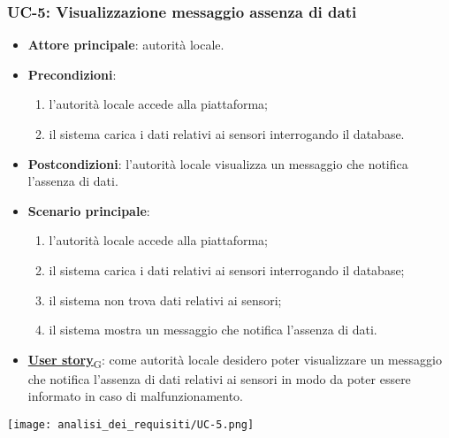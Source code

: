 
\newpage
\subsubsection{UC-5: Visualizzazione messaggio assenza di dati}
\begin{itemize}
	\item \textbf{Attore principale}: autorità locale.
	\item \textbf{Precondizioni}:
	      \begin{enumerate}
		      \item l'autorità locale accede alla piattaforma;
		      \item il sistema carica i dati relativi ai sensori interrogando il database.
	      \end{enumerate}
	\item \textbf{Postcondizioni}: l'autorità locale visualizza un messaggio che notifica l'assenza di dati.
	\item \textbf{Scenario principale}:
	      \begin{enumerate}
		      \item l'autorità locale accede alla piattaforma;
		      \item il sistema carica i dati relativi ai sensori interrogando il database;
		      \item il sistema non trova dati relativi ai sensori;
		      \item il sistema mostra un messaggio che notifica l'assenza di dati.
	      \end{enumerate}
	\item \href{https://7last.github.io/docs/pb/documentazione-interna/glossario\#user-story}{\textbf{User story}\textsubscript{G}}:
	      come autorità locale desidero poter visualizzare un messaggio che notifica l'assenza di dati relativi ai sensori
	      in modo da poter essere informato in caso di malfunzionamento.
\end{itemize}
\begin{center}
	\texttt{[image: analisi\_dei\_requisiti/UC-5.png]}
\end{center}

\newpage
